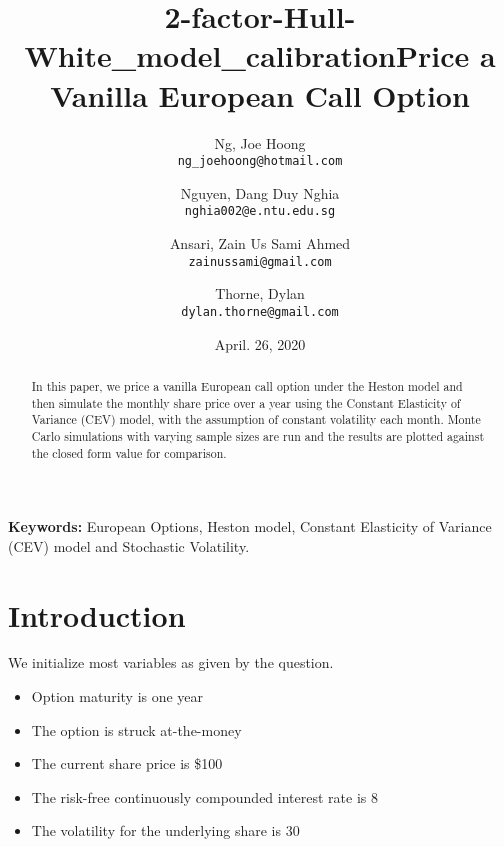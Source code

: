 \documentclass[11pt]{article}
\title{2-factor-Hull-White\_model\_calibration}
\begin{document}
\nocite{*} %

\title{Price a Vanilla European Call Option}

\author{
  Ng, Joe Hoong\\
  \texttt{ng\_joehoong@hotmail.com}
  \and
  Nguyen, Dang Duy Nghia \\
  \texttt{nghia002@e.ntu.edu.sg}
   \and
  Ansari, Zain Us Sami Ahmed \\
  \texttt{zainussami@gmail.com}  
   \and
   Thorne, Dylan \\
  \texttt{dylan.thorne@gmail.com}  
  }

\date{April. 26, 2020} %
\maketitle

\noindent
\textbf{Keywords:} European Options, Heston model,  Constant Elasticity of Variance (CEV) model and Stochastic Volatility.



\begin{abstract}
    In this paper, we price a vanilla European call option under the Heston model and then simulate the monthly share price over a year using the Constant Elasticity of Variance (CEV) model, with the assumption of constant volatility each month. Monte Carlo simulations with varying sample sizes are run and the results are plotted against the closed form value for comparison.
\end{abstract}

\section{Introduction
}
We initialize most variables as given by the question. 

\begin{itemize}
    \item Option maturity is one year
    \item The option is struck at-the-money
    \item The current share price is \$100
    \item The risk-free continuously compounded interest rate is 8%
    \item The volatility for the underlying share is 30%
\end{itemize}
\end{document}
